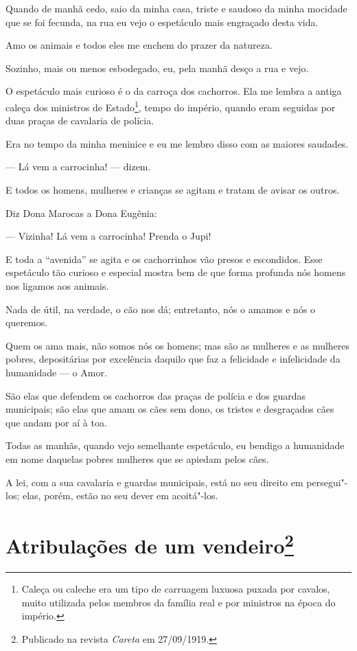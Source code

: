 Quando de manhã cedo, saio da minha casa, triste e saudoso da minha
mocidade que se foi fecunda, na rua eu vejo o espetáculo mais engraçado
desta vida.

Amo os animais e todos eles me enchem do prazer da natureza.

Sozinho, mais ou menos esbodegado, eu, pela manhã desço a rua e vejo.

O espetáculo mais curioso é o da carroça dos cachorros. Ela me lembra a
antiga caleça dos ministros de Estado\footnote{Caleça ou caleche era um
  tipo de carruagem luxuosa puxada por cavalos, muito utilizada pelos
  membros da família real e por ministros na época do império.}, tempo
do império, quando eram seguidas por duas praças de cavalaria de
polícia.

Era no tempo da minha meninice e eu me lembro disso com as maiores
saudades.

--- Lá vem a carrocinha! --- dizem.

E todos os homens, mulheres e crianças se agitam e tratam de avisar os
outros.

Diz Dona Marocas a Dona Eugênia:

--- Vizinha! Lá vem a carrocinha! Prenda o Jupi!

E toda a ``avenida'' se agita e os cachorrinhos vão presos e escondidos.
Esse espetáculo tão curioso e especial mostra bem de que forma profunda
nós homens nos ligamos aos animais.

Nada de útil, na verdade, o cão nos dá; entretanto, nós o amamos e nós o
queremos.

Quem os ama mais, não somos nós os homens; mas são as mulheres e as
mulheres pobres, depositárias por excelência daquilo que faz a
felicidade e infelicidade da humanidade --- o Amor.

São elas que defendem os cachorros das praças de polícia e dos guardas
municipais; são elas que amam os cães sem dono, os tristes e desgraçados
cães que andam por aí à toa.

Todas as manhãs, quando vejo semelhante espetáculo, eu bendigo a
humanidade em nome daquelas pobres mulheres que se apiedam pelos cães.

A lei, com a sua cavalaria e guardas municipais, está no seu direito em
persegui"-los; elas, porém, estão no seu dever em acoitá"-los.



\chapter[Atribulações de um vendeiro]{Atribulações de um vendeiro\footnote[*]{Publicado na revista \emph{Careta} em 27/09/1919.}}

